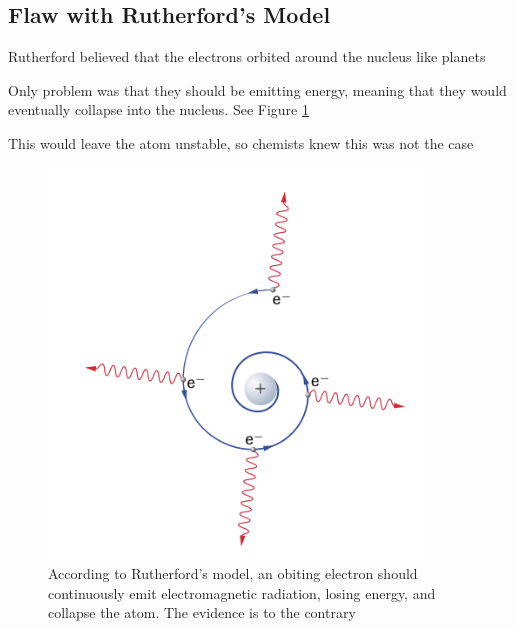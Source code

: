 \subsection{Flaw with Rutherford's Model}
\begin{bulleted-list}
    \item Rutherford believed that the electrons orbited around the nucleus like planets
    \item Only problem was that they should be emitting energy, meaning that they would eventually
        collapse into the nucleus. See Figure \ref{fig:rutherford-model-flaw}
    \item This would leave the atom unstable, so chemists knew this was not the case
\end{bulleted-list}

\begin{figure}[ht!]
    \centering
    \includegraphics[width=0.4 \textwidth]{../figures/rutherford-model-flaw.png}
    \caption{According to Rutherford's model, an obiting electron should continuously emit
            electromagnetic radiation, losing energy, and collapse the atom. The evidence is to the
            contrary}
    \label{fig:rutherford-model-flaw}
\end{figure}

